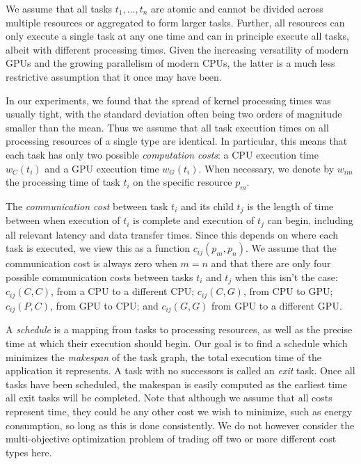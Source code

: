 \documentclass[runningheads]{llncs}
\begin{document}
We assume that all tasks $t_1, \dots, t_n$ are atomic and cannot be divided across multiple resources or aggregated to form larger tasks. Further, all resources can only execute a single task at any one time and can in principle execute all tasks, albeit with different processing times. Given the increasing versatility of modern GPUs and the growing parallelism of modern CPUs, the latter is a much less restrictive assumption that it once may have been. 

In our experiments, we found that the spread of kernel processing times was usually tight, with the standard deviation often being two orders of magnitude smaller than the mean. Thus we assume that all task execution times on all processing resources of a single type are identical. In particular, this means that each task has only two possible {\em computation costs}: a CPU execution time $w_C(t_i)$ and a GPU execution time $w_G(t_i)$. When necessary, we denote by $w_{im}$ the processing time of task $t_i$ on the specific resource $p_m$.

The {\em communication cost} between task $t_i$ and its child $t_j$ is the length of time between when execution of $t_i$ is complete and execution of $t_j$ can begin, including all relevant latency and data transfer times. Since this depends on where each task is executed, we view this as a function $c_{ij}(p_m, p_n)$. We assume that the communication cost is always zero when $m = n$ and that there are only four possible communication costs between tasks $t_i$ and $t_j$ when this isn't the case: $c_{ij}(C, C)$, from a CPU to a different CPU; $c_{ij}(C, G)$, from CPU to GPU; $c_{ij}(P, C)$, from GPU to CPU; and $c_{ij}(G, G)$ from GPU to a different GPU.  

A {\em schedule} is a mapping from tasks to processing resources, as well as the precise time at which their execution should begin. Our goal is to find a schedule which minimizes the {\em makespan} of the task graph, the total execution time of the application it represents. A task with no successors is called an {\em exit} task. Once all tasks have been scheduled, the makespan is easily computed as the earliest time all exit tasks will be completed. Note that although we assume that all costs represent time, they could be any other cost we wish to minimize, such as energy consumption, so long as this is done consistently. We do not however consider the multi-objective optimization problem of trading off two or more different cost types here. 
\end{document}
